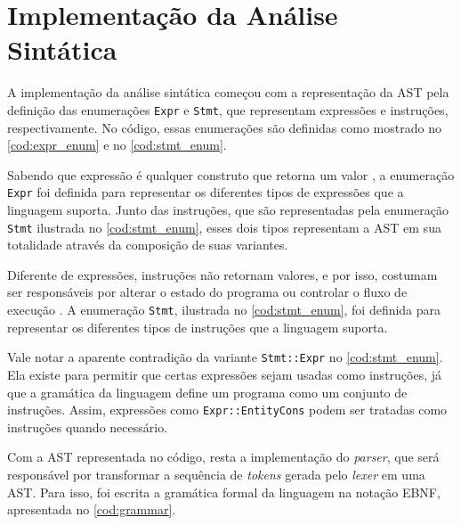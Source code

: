 \section{Implementação da Análise Sintática}

A implementação da análise sintática começou com a representação da AST pela definição das enumerações \texttt{Expr} e \texttt{Stmt}, que representam expressões e instruções, respectivamente. No código, essas enumerações são definidas como mostrado no \autoref{cod:expr_enum} e no \autoref{cod:stmt_enum}.

\codigoRust

\vspace{-1em}

Sabendo que expressão é qualquer construto que retorna um valor \cite{craftinginterpreters}, a enumeração \texttt{Expr} foi definida para representar os diferentes tipos de expressões que a linguagem suporta. Junto das instruções, que são representadas pela enumeração \texttt{Stmt} ilustrada no \autoref{cod:stmt_enum}, esses dois tipos representam a AST em sua totalidade através da composição de suas variantes.

Diferente de expressões, instruções não retornam valores, e por isso, costumam ser responsáveis por alterar o estado do programa ou controlar o fluxo de execução \cite{craftinginterpreters}. A enumeração \texttt{Stmt}, ilustrada no \autoref{cod:stmt_enum}, foi definida para representar os diferentes tipos de instruções que a linguagem suporta.

\codigoRust

\vspace{-1em}

Vale notar a aparente contradição da variante \texttt{Stmt::Expr} no \autoref{cod:stmt_enum}. Ela existe para permitir que certas expressões sejam usadas como instruções, já que a gramática da linguagem define um programa como um conjunto de instruções. Assim, expressões como \texttt{Expr::EntityCons} podem ser tratadas como instruções quando necessário.

Com a AST representada no código, resta a implementação do \textit{parser}, que será responsável por transformar a sequência de \textit{tokens} gerada pelo \textit{lexer} em uma AST. Para isso, foi escrita a gramática formal da linguagem na notação EBNF, apresentada no \autoref{cod:grammar}.

